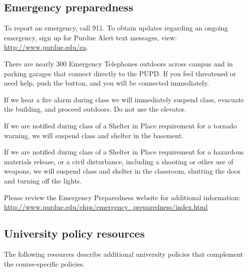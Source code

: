 \documentclass[letterpaper,11pt]{article}
\begin{document}
\subsection*{Emergency preparedness}

To report an emergency, call 911. To obtain updates regarding an ongoing emergency, sign up for Purdue Alert text messages, view:\\
\url{http://www.purdue.edu/ea}.

There are nearly 300 Emergency Telephones outdoors across campus and in parking garages that connect directly to the PUPD. If you feel threatened or need help, push the button, and you will be connected immediately.

If we hear a fire alarm during class we will immediately suspend class, evacuate the building, and proceed outdoors. Do not use the elevator.

If we are notified during class of a Shelter in Place requirement for a tornado warning, we will suspend class and shelter in the basement.

If we are notified during class of a Shelter in Place requirement for a hazardous materials release, or a civil disturbance, including a shooting or other use of weapons, we will suspend class and shelter in the classroom, shutting the door and turning off the lights.

Please review the Emergency Preparedness website for additional information:\\
\url{http://www.purdue.edu/ehps/emergency_preparedness/index.html}

\subsection*{University policy resources}

The following resources describe additional university policies that complement the course-specific policies.
\end{document}

